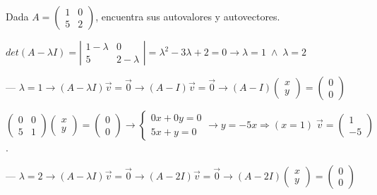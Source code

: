 \begin{ejem}
Dada $A=\left( \begin{matrix} 1&0\\5&2 \end{matrix} \right)$, encuentra sus autovalores y autovectores.

$det(A-\lambda I)=\left| \begin{matrix} 1-\lambda&0\\5&2-\lambda \end{matrix} \right|=\lambda^2-3\lambda+2=0 \longrightarrow \lambda =1 \; \wedge \; \lambda=2$

--- $\lambda =1 \longrightarrow (A-\lambda I)\vec v=\vec 0 \to (A-I)\vec v=\vec 0\to (A-I)\left( \begin{matrix} x\\y \end{matrix} \right) = \left( \begin{matrix} 0\\0 \end{matrix} \right)$ 

\noindent \small{$\left( \begin{matrix} 0&0\\5&1 \end{matrix} \right)\left( \begin{matrix} x\\y \end{matrix} \right) = \left( \begin{matrix} 0\\0 \end{matrix} \right) \to \begin{cases} 0x+0y=0\\5x+y=0 \end{cases} \to y=-5x \Rightarrow (x=1)\; 
\vec v=\left( \begin{matrix} 1\\-5 \end{matrix} \right)$}\normalsize{.}


--- $\lambda =2 \longrightarrow (A-\lambda I)\vec v=\vec 0 \to (A-2I)\vec v=\vec 0\to (A-2I)\left( \begin{matrix} x\\y \end{matrix} \right) = \left( \begin{matrix} 0\\0 \end{matrix} \right)$	


\end{ejem}
